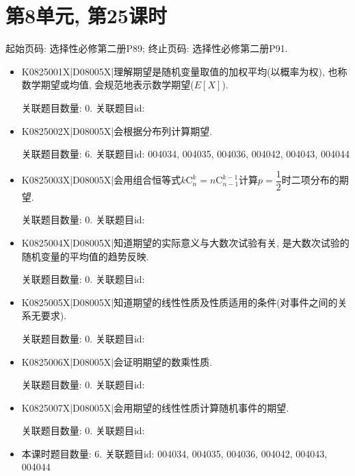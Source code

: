 \section*{第8单元, 第25课时}
起始页码: 选择性必修第二册P89; 终止页码: 选择性必修第二册P91.
\begin{itemize}
\item K0825001X|D08005X|理解期望是随机变量取值的加权平均(以概率为权), 也称数学期望或均值, 会规范地表示数学期望($E[X]$).

关联题目数量: 0. 关联题目id: 

\item K0825002X|D08005X|会根据分布列计算期望.

关联题目数量: 6. 关联题目id: 004034, 004035, 004036, 004042, 004043, 004044

\item K0825003X|D08005X|会用组合恒等式$k\mathrm{C}_n^k=n\mathrm{C}_{n-1}^{k-1}$计算$p=\dfrac 12$时二项分布的期望.

关联题目数量: 0. 关联题目id: 

\item K0825004X|D08005X|知道期望的实际意义与大数次试验有关, 是大数次试验的随机变量的平均值的趋势反映.

关联题目数量: 0. 关联题目id: 

\item K0825005X|D08005X|知道期望的线性性质及性质适用的条件(对事件之间的关系无要求).

关联题目数量: 0. 关联题目id: 

\item K0825006X|D08005X|会证明期望的数乘性质.

关联题目数量: 0. 关联题目id: 

\item K0825007X|D08005X|会用期望的线性性质计算随机事件的期望.

关联题目数量: 0. 关联题目id: 

\item 本课时题目数量: 6. 关联题目id: 004034, 004035, 004036, 004042, 004043, 004044

\end{itemize}

